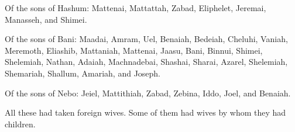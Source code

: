 \myverse{}Of the sons of Hashum: Mattenai, Mattattah, Zabad,
Eliphelet, Jeremai, Manasseh, and Shimei.

\myverse{}Of the sons of Bani: Maadai, Amram, Uel,
\myverse{}Benaiah, Bedeiah, Cheluhi,
\myverse{}Vaniah, Meremoth, Eliashib,
\myverse{}Mattaniah, Mattenai, Jaasu,
\myverse{}Bani, Binnui, Shimei,
\myverse{}Shelemiah, Nathan, Adaiah,
\myverse{}Machnadebai, Shashai, Sharai,
\myverse{}Azarel, Shelemiah, Shemariah,
\myverse{}Shallum, Amariah, and Joseph.

\myverse{}Of the sons of Nebo: Jeiel, Mattithiah, Zabad, Zebina,
Iddo, Joel, and Benaiah.

\myverse{}All these had taken foreign wives. Some of them had wives by
whom they had children.


